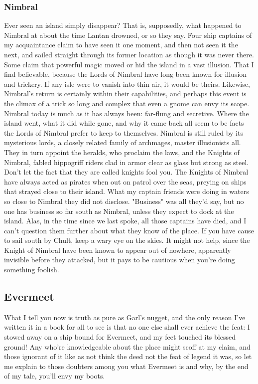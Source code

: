 \documentclass[10pt,a4paper,twoside,twocolumn,openany,bg=print,nodeprecatedcode]{dndbook}
\begin{document}
\subsubsection{Nimbral}
Ever seen an island simply disappear? That is, supposedly, what happened to Nimbral at about the time Lantan drowned, or so they say. Four ship captains of my acquaintance claim to have seen it one moment, and then not seen it the next, and sailed straight through its former location as though it was never there.
Some claim that powerful magic moved or hid the island in a vast illusion. That I find believable, because the Lords of Nimbral have long been known for illusion and trickery. If any isle were to vanish into thin air, it would be theirs. Likewise, Nimbral's return is certainly within their capabilities, and perhaps this event is the climax of a trick so long and complex that even a gnome can envy its scope.
Nimbral today is much as it has always been: far-flung and secretive. Where the island went, what it did while gone, and why it came back all seem to be facts the Lords of Nimbral prefer to keep to themselves.
Nimbral is still ruled by its mysterious lords, a closely related family of archmages, master illusionists all. They in turn appoint the heralds, who proclaim the laws, and the Knights of Nimbral, fabled hippogriff riders clad in armor clear as glass but strong as steel. Don't let the fact that they are called knights fool you. The Knights of Nimbral have always acted as pirates when out on patrol over the seas, preying on ships that strayed close to their island.
What my captain friends were doing in waters so close to Nimbral they did not disclose. "Business" was all they'd say, but no one has business so far south as Nimbral, unless they expect to dock at the island. Alas, in the time since we last spoke, all those captains have died, and I can't question them further about what they know of the place.
If you have cause to sail south by Chult, keep a wary eye on the skies. It might not help, since the Knight of Nimbral have been known to appear out of nowhere, apparently invisible before they attacked, but it pays to be cautious when you're doing something foolish.
\subsection{Evermeet}
What I tell you now is truth as pure as Garl's nugget, and the only reason I've written it in a book for all to see is that no one else shall ever achieve the feat: I stowed away on a ship bound for Evermeet, and my feet touched its blessed ground!
Any who're knowledgeable about the place might scoff at my claim, and those ignorant of it like as not think the deed not the feat of legend it was, so let me explain to those doubters among you what Evermeet is and why, by the end of my tale, you'll envy my boots.
\end{document}
